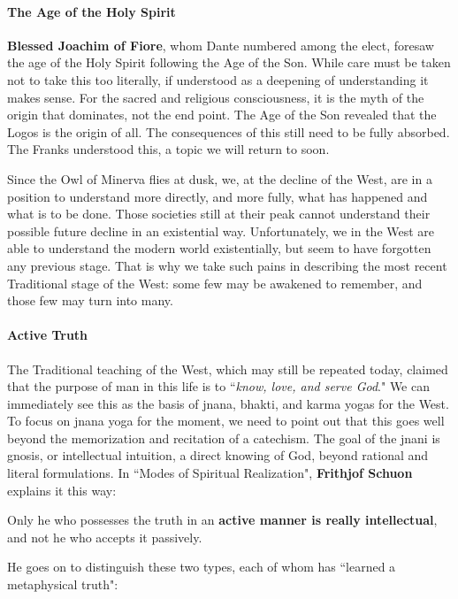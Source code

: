 \paragraph{The Age of the Holy Spirit}
\textbf{Blessed Joachim of Fiore}, whom Dante numbered among the elect, foresaw the age of the Holy Spirit following the Age of the Son. While care must be taken not to take this too literally, if understood as a deepening of understanding it makes sense. For the sacred and religious consciousness, it is the myth of the origin that dominates, not the end point. The Age of the Son revealed that the Logos is the origin of all. The consequences of this still need to be fully absorbed. The Franks understood this, a topic we will return to soon. 

Since the Owl of Minerva flies at dusk, we, at the decline of the West, are in a position to understand more directly, and more fully, what has happened and what is to be done. Those societies still at their peak cannot understand their possible future decline in an existential way. Unfortunately, we in the West are able to understand the modern world existentially, but seem to have forgotten any previous stage. That is why we take such pains in describing the most recent Traditional stage of the West: some few may be awakened to remember, and those few may turn into many.

\paragraph{Active Truth}
The Traditional teaching of the West, which may still be repeated today, claimed that the purpose of man in this life is to ``\emph{know, love, and serve God}." We can immediately see this as the basis of jnana, bhakti, and karma yogas for the West. To focus on jnana yoga for the moment, we need to point out that this goes well beyond the memorization and recitation of a catechism. The goal of the jnani is gnosis, or intellectual intuition, a direct knowing of God, beyond rational and literal formulations. In ``Modes of Spiritual Realization", \textbf{Frithjof Schuon} explains it this way:

\begin{quotex}
Only he who possesses the truth in an \textbf{active manner is really intellectual}, and not he who accepts it passively. 

\end{quotex}
He goes on to distinguish these two types, each of whom has ``learned a metaphysical truth":

